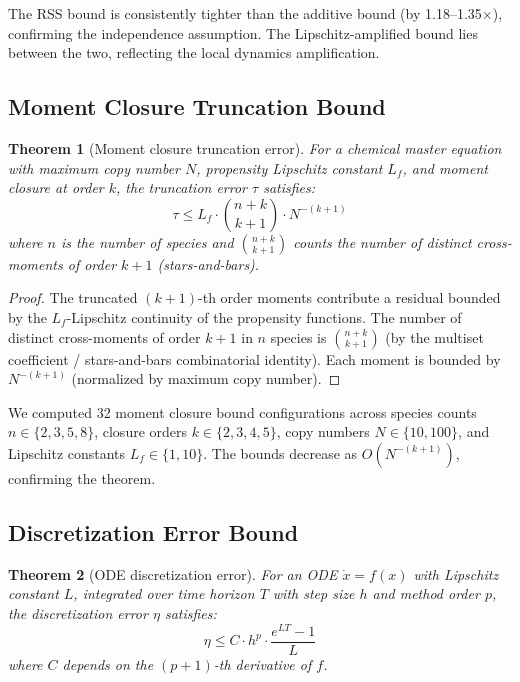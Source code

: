 \documentclass[11pt]{article}
\newtheorem{theorem}{Theorem}
\begin{document}
The RSS bound is consistently tighter than the additive bound (by
1.18--1.35$\times$), confirming the independence assumption. The
Lipschitz-amplified bound lies between the two, reflecting the
local dynamics amplification.

\subsection{Moment Closure Truncation Bound}

\begin{theorem}[Moment closure truncation error]
\label{thm:closure}
For a chemical master equation with maximum copy number $N$, propensity
Lipschitz constant $L_f$, and moment closure at order $k$, the
truncation error $\tau$ satisfies:
\begin{equation}
\tau \leq L_f \cdot \binom{n+k}{k+1} \cdot N^{-(k+1)}
\end{equation}
where $n$ is the number of species and $\binom{n+k}{k+1}$ counts the
number of distinct cross-moments of order $k+1$ (stars-and-bars).
\end{theorem}

\begin{proof}
The truncated $(k+1)$-th order moments contribute a residual bounded
by the $L_f$-Lipschitz continuity of the propensity functions.
The number of distinct cross-moments of order $k+1$ in $n$ species
is $\binom{n+k}{k+1}$ (by the multiset coefficient / stars-and-bars
combinatorial identity). Each moment is bounded by $N^{-(k+1)}$
(normalized by maximum copy number).
\end{proof}

We computed 32 moment closure bound configurations across species
counts $n \in \{2,3,5,8\}$, closure orders $k \in \{2,3,4,5\}$,
copy numbers $N \in \{10, 100\}$, and Lipschitz constants
$L_f \in \{1, 10\}$. The bounds decrease as $O(N^{-(k+1)})$,
confirming the theorem.

\subsection{Discretization Error Bound}

\begin{theorem}[ODE discretization error]
\label{thm:disc}
For an ODE $\dot{x} = f(x)$ with Lipschitz constant $L$, integrated
over time horizon $T$ with step size $h$ and method order $p$, the
discretization error $\eta$ satisfies:
\begin{equation}
\eta \leq C \cdot h^p \cdot \frac{e^{LT} - 1}{L}
\end{equation}
where $C$ depends on the $(p+1)$-th derivative of $f$.
\end{theorem}
\end{document}
